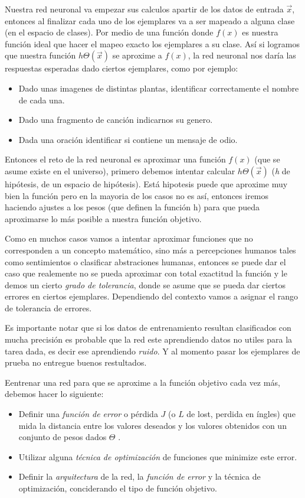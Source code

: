 Nuestra red neuronal va empezar sus calculos apartir de los datos de entrada $\vec{x}$, entonces al finalizar cada uno de los ejemplares va a ser mapeado a alguna clase (en el espacio de clases). Por medio de una función donde $f(x)$ es nuestra función ideal que hacer el mapeo exacto los ejemplares a su clase. Así si logramos que nuestra función $h\Theta(\vec{x})$ se aproxime a $f(x)$, la red neuronal nos daría las respuestas esperadas dado ciertos ejemplares, como por ejemplo:
\begin{itemize}
 \item Dado unas imagenes de distintas plantas, identificar correctamente el nombre de cada una.
 \item Dado una fragmento de canción indicarnos su genero.
 \item Dada una oración identificar si contiene un mensaje de odio.
\end{itemize}

Entonces el reto de la red neuronal es aproximar una función $f(x)$ (que se asume existe en el universo),
primero debemos intentar calcular $h\Theta(\vec{x})$ (\emph{h} de hipótesis, de un espacio de hipótesis). Está hipotesis puede que aproxime muy bien la función pero en la mayoria de los casos no es así, entonces iremos haciendo ajustes a los pesos (que definen la función h) para que pueda aproximarse lo más posible a nuestra función objetivo.


Como en muchos casos vamos a intentar aproximar funciones que no corresponden a un concepto matemático, sino más a percepciones humanos tales como sentimientos o clasificar abstraciones humanas, entonces se puede dar el caso que realemente no se pueda aproximar con total exactitud la función y le demos un cierto \emph{grado de tolerancia}, donde se asume que se pueda dar ciertos errores en ciertos ejemplares. Dependiendo del contexto vamos a asignar el rango de tolerancia de errores.

Es importante notar que si los datos de entrenamiento resultan clasificados con mucha precisión es probable que la red este aprendiendo datos no utiles para la tarea dada, es decir ese aprendiendo \emph{ruido}. Y al momento pasar los ejemplares de prueba no entregue buenos restultados.

Eentrenar una red para que se aproxime a la función objetivo cada vez más, debemos hacer lo siguiente:
\begin{itemize}
 \item  Definir una \emph{función de error} o pérdida $J$ (o $L$ de lost, perdida en íngles) que mida la distancia entre los valores deseados y los valores obtenidos con un conjunto de pesos dados $\Theta$ .
 \item Utilizar alguna \emph{técnica de optimización} de funciones que minimize este error.
 \item Definir la \emph{arquitectura} de la red, la \emph{función de error} y la técnica de
optimización, conciderando el tipo de función objetivo.
\end{itemize}

